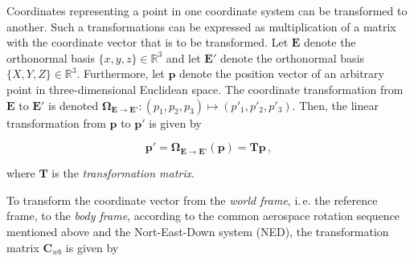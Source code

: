 Coordinates representing a point in one coordinate system can be transformed to another. Such a transformations can be expressed as multiplication of a matrix with the coordinate vector that is to be transformed. Let $\mathbf{E}$ denote the orthonormal basis $\{x, y, z\} \in \mathbb{R}^3$ and let $\mathbf{E}'$ denote the orthonormal basis $\{X, Y, Z\} \in \mathbb{R}^3$. Furthermore, let $\mathbf{p}$ denote the position vector of an arbitrary point in three-dimensional Euclidean space. The coordinate transformation from $\mathbf{E}$ to $\mathbf{E}'$ is denoted $\bm{\Omega}_{\mathbf{E} \rightarrow \mathbf{E}'}: (p_1, p_2, p_3) \mapsto (p'_1, p'_2, p'_3)$. Then, the linear transformation from $\mathbf{p}$ to $\mathbf{p}'$ is given by

\begin{equation}\label{eq:transformation}
  \mathbf{p'} = \bm{\Omega}_{\mathbf{E} \rightarrow \mathbf{E}'}(\mathbf{p}) = \mathbf{T} \mathbf{p}\,,
\end{equation}

\noindent
where $\mathbf{T}$ is the \emph{transformation matrix}.

To transform the coordinate vector from the \emph{world frame}, i.\,e. the reference frame, to the \emph{body frame}, according to the common aerospace rotation sequence mentioned above and the Nort-East-Down system (NED), the transformation matrix $\mathbf{C}_{wb}$ is given by

